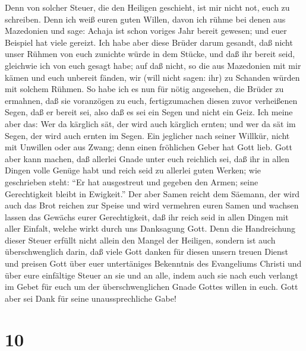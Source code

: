  Denn von solcher Steuer, die den Heiligen geschieht, ist
mir nicht not, euch zu schreiben.  Denn ich weiß euren guten
Willen, davon ich rühme bei denen aus Mazedonien und sage: Achaja ist
schon voriges Jahr bereit gewesen; und euer Beispiel hat viele gereizt.
 Ich habe aber diese Brüder darum gesandt, daß nicht unser
Rühmen von euch zunichte würde in dem Stücke, und daß ihr bereit seid,
gleichwie ich von euch gesagt habe;  auf daß nicht, so die
aus Mazedonien mit mir kämen und euch unbereit fänden, wir (will nicht
sagen: ihr) zu Schanden würden mit solchem Rühmen.  So habe
ich es nun für nötig angesehen, die Brüder zu ermahnen, daß sie
voranzögen zu euch, fertigzumachen diesen zuvor verheißenen Segen, daß
er bereit sei, also daß es sei ein Segen und nicht ein Geiz.
 Ich meine aber das: Wer da kärglich sät, der wird auch
kärglich ernten; und wer da sät im Segen, der wird auch ernten im Segen.
 Ein jeglicher nach seiner Willkür, nicht mit Unwillen oder
aus Zwang; denn einen fröhlichen Geber hat Gott lieb.  Gott
aber kann machen, daß allerlei Gnade unter euch reichlich sei, daß ihr
in allen Dingen volle Genüge habt und reich seid zu allerlei guten
Werken;  wie geschrieben steht: ``Er hat ausgestreut und
gegeben den Armen; seine Gerechtigkeit bleibt in Ewigkeit.''
 Der aber Samen reicht dem Säemann, der wird auch das Brot
reichen zur Speise und wird vermehren euren Samen und wachsen lassen das
Gewächs eurer Gerechtigkeit,  daß ihr reich seid in allen
Dingen mit aller Einfalt, welche wirkt durch uns Danksagung Gott.
 Denn die Handreichung dieser Steuer erfüllt nicht allein
den Mangel der Heiligen, sondern ist auch überschwenglich darin, daß
viele Gott danken für diesen unsern treuen Dienst  und
preisen Gott über euer untertäniges Bekenntnis des Evangeliums Christi
und über eure einfältige Steuer an sie und an alle,  indem
auch sie nach euch verlangt im Gebet für euch um der überschwenglichen
Gnade Gottes willen in euch.  Gott aber sei Dank für seine
unaussprechliche Gabe!

\hypertarget{section-9}{%
\section{10}\label{section-9}}

